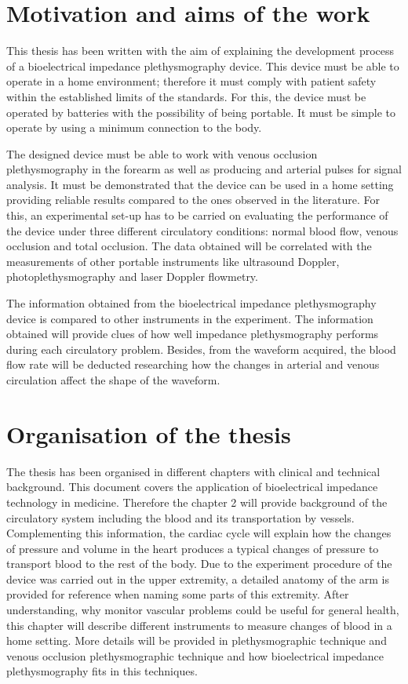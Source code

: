 \section{Motivation and aims of the work}
This thesis has been written with the aim of explaining the development process of a bioelectrical impedance plethysmography device. This device must be able to operate in a home environment; therefore it must comply with patient safety within the established limits of the standards. For this, the device must be operated by batteries with the possibility of being portable. It must be simple to operate by using a minimum connection to the body.

The designed device must be able to work with venous occlusion plethysmography in the forearm as well as producing and arterial pulses for signal analysis. It must be demonstrated that the device can be used in a home setting providing reliable results compared to the ones observed in the literature. For this, an experimental set-up has to be carried on evaluating the performance of the device under three different circulatory conditions: normal blood flow, venous occlusion and total occlusion. The data obtained will be correlated with the measurements of other portable instruments like ultrasound Doppler, photoplethysmography and laser Doppler flowmetry.

The information obtained from the bioelectrical impedance plethysmography device is compared to other instruments in the experiment. The information obtained will provide clues of how well impedance plethysmography performs during each circulatory problem. Besides, from the waveform acquired, the blood flow rate will be deducted researching how the changes in arterial and venous circulation affect the shape of the waveform.


\section{Organisation of the thesis}
The thesis has been organised in different chapters with clinical and technical background. This document covers the application of bioelectrical impedance technology in medicine. Therefore the chapter 2 will provide background of the circulatory system including the blood and its transportation by vessels. Complementing this information, the cardiac cycle will explain how the changes of pressure and volume in the heart produces a typical changes of pressure to transport blood to the rest of the body. Due to the experiment procedure of the device was carried out in the upper extremity, a detailed anatomy of the arm is provided for reference when naming some parts of this extremity. After understanding, why monitor vascular problems could be useful for general health, this chapter will describe different instruments to measure changes of blood in a home setting. More details will be provided in plethysmographic technique and venous occlusion plethysmographic technique and how bioelectrical impedance plethysmography fits in this techniques. 

